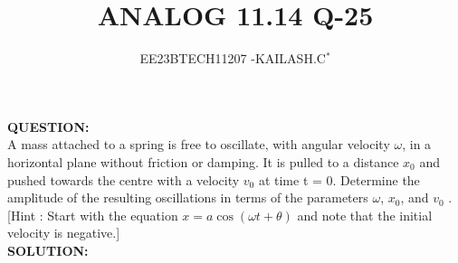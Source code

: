 \documentclass[journal,12pt,twocolumn]{IEEEtran}
\theoremstyle{remark}
\begin{document}

\vspace{3cm}

\title{ANALOG 11.14 Q-25}
\author{EE23BTECH11207 -KAILASH.C$^{*}$%
}
\maketitle
\newpage
\bigskip

\renewcommand{\thefigure}{\theenumi}
\renewcommand{\thetable}{\theenumi}
\textbf{QUESTION:}\\
A mass attached to a spring is free to oscillate, with angular velocity $\omega$, in a horizontal
plane without friction or damping. It is pulled to a distance $x_0$
 and pushed towards
the centre with a velocity $v_0$
 at time t = 0. Determine the amplitude of the resulting
oscillations in terms of the parameters $\omega{}$, $x_0$,
 and $v_0$
. [Hint : Start with the equation
$x = a \cos(\omega{t}+\theta{})$ and note that the initial velocity is negative.]\\
\textbf{SOLUTION:}
\end{document}
